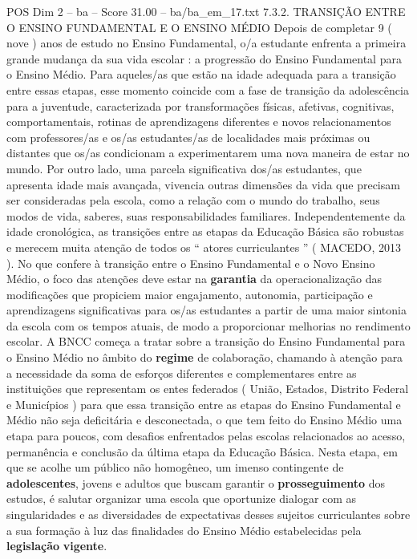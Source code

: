 \begin{textsample}{POS Dim 2 – ba – Score 31.00 – ba/ba\_em\_17.txt}  \label{ex:f2_pos_035}
7.3.2.
TRANSIÇÃO ENTRE O ENSINO FUNDAMENTAL E O ENSINO MÉDIO Depois de completar 9 ( nove ) anos de estudo no Ensino Fundamental, o/a estudante enfrenta a primeira grande mudança da sua vida escolar : a progressão do Ensino Fundamental para o Ensino Médio.
Para aqueles/as que estão na idade adequada para a transição entre essas etapas, esse momento coincide com a fase de transição da adolescência para a juventude, caracterizada por transformações físicas, afetivas, cognitivas, comportamentais, rotinas de aprendizagens diferentes e novos relacionamentos com professores/as e os/as estudantes/as de localidades mais próximas ou distantes que os/as condicionam a experimentarem uma nova maneira de estar no mundo.
Por outro lado, uma parcela significativa dos/as estudantes, que apresenta idade mais avançada, vivencia outras dimensões da vida que precisam ser consideradas pela escola, como a relação com o mundo do trabalho, seus modos de vida, saberes, suas responsabilidades familiares.
Independentemente da idade cronológica, as transições entre as etapas da Educação Básica são robustas e merecem muita atenção de todos os “ atores curriculantes ” ( MACEDO, 2013 ).
No que confere à transição entre o Ensino Fundamental e o Novo Ensino Médio, o foco das atenções deve estar na \textbf{garantia} da operacionalização das modificações que propiciem maior engajamento, autonomia, participação e aprendizagens significativas para os/as estudantes a partir de uma maior sintonia da escola com os tempos atuais, de modo a proporcionar melhorias no rendimento escolar.
A BNCC começa a tratar sobre a transição do Ensino Fundamental para o Ensino Médio no âmbito do \textbf{regime} de colaboração, chamando à atenção para a necessidade da soma de esforços diferentes e complementares entre as instituições que representam os entes federados ( União, Estados, Distrito Federal e Municípios ) para que essa transição entre as etapas do Ensino Fundamental e Médio não seja deficitária e desconectada, o que tem feito do Ensino Médio uma etapa para poucos, com desafios enfrentados pelas escolas relacionados ao acesso, permanência e conclusão da última etapa da Educação Básica.
Nesta etapa, em que se acolhe um público não homogêneo, um imenso contingente de \textbf{adolescentes}, jovens e adultos que buscam garantir o \textbf{prosseguimento} dos estudos, é salutar organizar uma escola que oportunize dialogar com as singularidades e as diversidades de expectativas desses sujeitos curriculantes sobre a sua formação à luz das finalidades do Ensino Médio estabelecidas pela \textbf{legislação} \textbf{vigente}.

\end{textsample}
